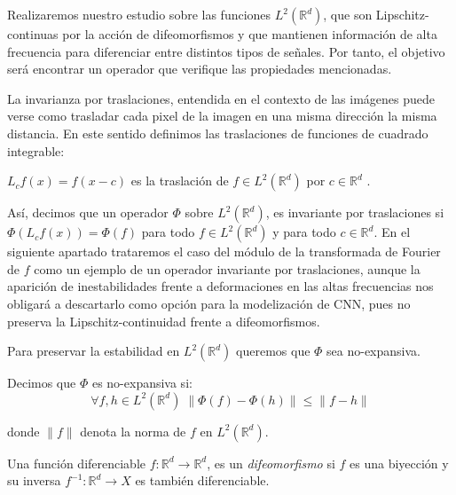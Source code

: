 \medskip


\noindent Realizaremos nuestro estudio sobre las funciones $L^2(\mathbb{R}^d)$, que son Lipschitz-continuas por la acción de difeomorfismos y que mantienen información de alta frecuencia para diferenciar entre distintos tipos de señales. Por tanto, el objetivo será encontrar un operador que verifique las propiedades mencionadas.

\medskip

\noindent La invarianza por traslaciones, entendida en el contexto de las imágenes puede verse como trasladar cada pixel de la imagen en una misma dirección la misma distancia. En este sentido definimos las traslaciones de funciones de cuadrado integrable: 

\begin{definicion}
$L_cf(x)=f(x-c)$ es la traslación de $f \in L^2(\mathbb{R}^d)$ por $c \in \mathbb{R}^d$ .
\end{definicion}

\medskip

\noindent Así, decimos que un operador $\Phi$ sobre  $L^2(\mathbb{R}^d)$, es invariante por traslaciones si $\Phi(L_cf(x))=\Phi(f)$ para todo $f \in L^2(\mathbb{R}^d)$ y para todo $c \in \mathbb{R}^d$. En el siguiente apartado trataremos el caso del módulo de la transformada de Fourier de $f$ como un ejemplo de un operador invariante por traslaciones, aunque la aparición de inestabilidades frente a deformaciones en las altas frecuencias nos obligará a descartarlo como opción para la modelización de CNN, pues no preserva la Lipschitz-continuidad frente a difeomorfismos.

\medskip

\noindent Para preservar la estabilidad en $L^2(\mathbb{R}^d)$ queremos que $\Phi$ sea no-expansiva.

\begin{definicion}
Decimos que $\Phi$ es no-expansiva si: 
$$\forall f,h \in L^2(\mathbb{R}^d)\; \| \Phi(f)-\Phi(h)\| \leq \|f-h\|$$
\end{definicion}

\noindent donde $\| f\|$ denota la norma de $f$ en  $L^2(\mathbb{R}^d)$.


\begin{definicion}
  Una función diferenciable $f: \mathbb{R}^d \rightarrow \mathbb{R}^d$, es un \textit{difeomorfismo} si $f$ es una biyección y su inversa $f^{-1}:\mathbb{R}^d \rightarrow X$ es también diferenciable. 
\end{definicion}


